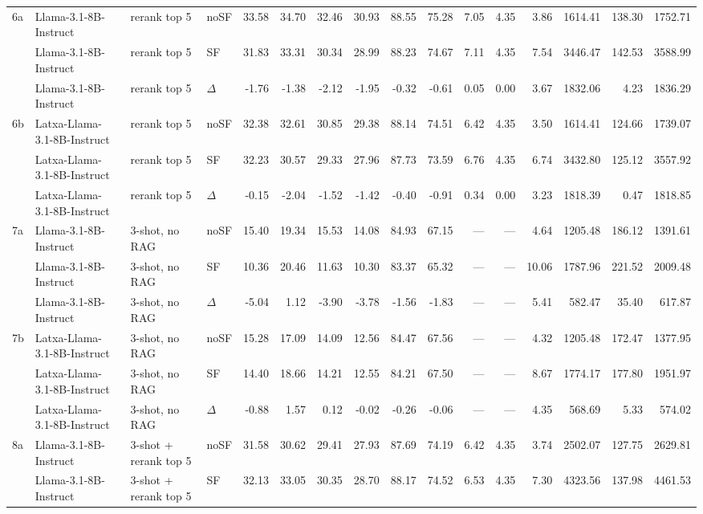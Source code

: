 \begin{landscape}
\begin{footnotesize}
\begin{longtable}{l l l l r r r r r r r r r r r r}
\midrule
\rowcolor{tabhighlight}6a & Llama-3.1-8B-Instruct & rerank top 5 & noSF & 33.58 & 34.70 & 32.46 & 30.93 & 88.55 & 75.28 & 7.05 & 4.35 & 3.86 & 1614.41 & 138.30 & 1752.71 \\
 & Llama-3.1-8B-Instruct & rerank top 5 & SF & 31.83 & 33.31 & 30.34 & 28.99 & 88.23 & 74.67 & 7.11 & 4.35 & 7.54 & 3446.47 & 142.53 & 3588.99 \\
 & Llama-3.1-8B-Instruct & rerank top 5 & $\Delta$ & -1.76 & -1.38 & -2.12 & -1.95 & -0.32 & -0.61 & 0.05 & 0.00 & 3.67 & 1832.06 & 4.23 & 1836.29 \\
6b & Latxa-Llama-3.1-8B-Instruct & rerank top 5 & noSF & 32.38 & 32.61 & 30.85 & 29.38 & 88.14 & 74.51 & 6.42 & 4.35 & 3.50 & 1614.41 & 124.66 & 1739.07 \\
 & Latxa-Llama-3.1-8B-Instruct & rerank top 5 & SF & 32.23 & 30.57 & 29.33 & 27.96 & 87.73 & 73.59 & 6.76 & 4.35 & 6.74 & 3432.80 & 125.12 & 3557.92 \\
 & Latxa-Llama-3.1-8B-Instruct & rerank top 5 & $\Delta$ & -0.15 & -2.04 & -1.52 & -1.42 & -0.40 & -0.91 & 0.34 & 0.00 & 3.23 & 1818.39 & 0.47 & 1818.85 \\
\midrule
7a & Llama-3.1-8B-Instruct & 3-shot, no RAG & noSF & 15.40 & 19.34 & 15.53 & 14.08 & 84.93 & 67.15 & --- & --- & 4.64 & 1205.48 & 186.12 & 1391.61 \\
 & Llama-3.1-8B-Instruct & 3-shot, no RAG & SF & 10.36 & 20.46 & 11.63 & 10.30 & 83.37 & 65.32 & --- & --- & 10.06 & 1787.96 & 221.52 & 2009.48 \\
 & Llama-3.1-8B-Instruct & 3-shot, no RAG & $\Delta$ & -5.04 & 1.12 & -3.90 & -3.78 & -1.56 & -1.83 & --- & --- & 5.41 & 582.47 & 35.40 & 617.87 \\
7b & Latxa-Llama-3.1-8B-Instruct & 3-shot, no RAG & noSF & 15.28 & 17.09 & 14.09 & 12.56 & 84.47 & 67.56 & --- & --- & 4.32 & 1205.48 & 172.47 & 1377.95 \\
 & Latxa-Llama-3.1-8B-Instruct & 3-shot, no RAG & SF & 14.40 & 18.66 & 14.21 & 12.55 & 84.21 & 67.50 & --- & --- & 8.67 & 1774.17 & 177.80 & 1951.97 \\
 & Latxa-Llama-3.1-8B-Instruct & 3-shot, no RAG & $\Delta$ & -0.88 & 1.57 & 0.12 & -0.02 & -0.26 & -0.06 & --- & --- & 4.35 & 568.69 & 5.33 & 574.02 \\
\midrule
8a & Llama-3.1-8B-Instruct & 3-shot + rerank top 5 & noSF & 31.58 & 30.62 & 29.41 & 27.93 & 87.69 & 74.19 & 6.42 & 4.35 & 3.74 & 2502.07 & 127.75 & 2629.81 \\
 & Llama-3.1-8B-Instruct & 3-shot + rerank top 5 & SF & 32.13 & 33.05 & 30.35 & 28.70 & 88.17 & 74.52 & 6.53 & 4.35 & 7.30 & 4323.56 & 137.98 & 4461.53 \\

\end{longtable}
\end{footnotesize}
\end{landscape}
